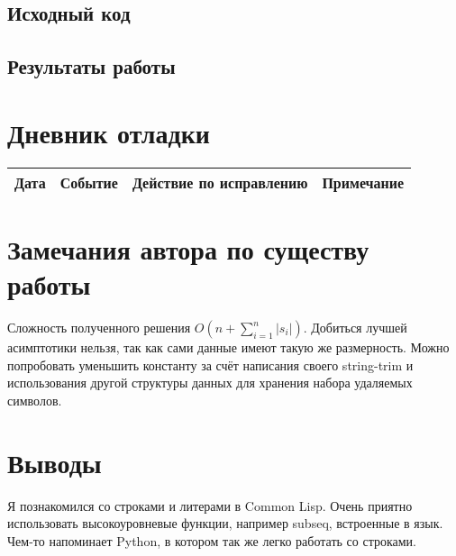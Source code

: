 \documentclass[12pt]{article}
\begin{document}
\subsection{Исходный код}


\pagebreak
\subsection{Результаты работы}


\pagebreak
\section{Дневник отладки}
\begin{tabular}{|p{50pt}|p{140pt}|p{140pt}|p{80pt}|}
\hline
Дата & Событие & Действие по исправлению & Примечание \\
\hline
\end{tabular}

\section{Замечания автора по существу работы}

Сложность полученного решения $O(n + \sum_{i=1}^n{|s_i|})$. Добиться лучшей асимптотики нельзя, так как сами данные имеют такую же размерность. Можно попробовать уменьшить константу за счёт написания своего string-trim и использования другой структуры данных для хранения набора удаляемых символов.

\section{Выводы}
Я познакомился со строками и литерами в Common Lisp. Очень приятно использовать высокоуровневые функции, например subseq, встроенные в язык. Чем-то напоминает Python, в котором так же легко работать со строками.
\end{document}
